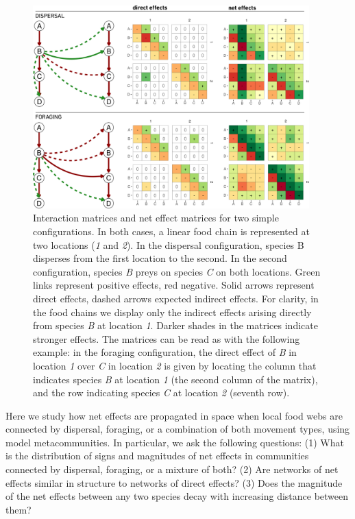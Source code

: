 \begin{figure}[!ht]
\includegraphics[width=0.95\textwidth,height=\textheight,keepaspectratio]{./Figures/chapter05/Fig_1.png}
\caption[Direct and net effects example]{\color{Gray}Interaction matrices and net effect matrices for two simple configurations. In both cases, a linear food chain is represented at two locations (\textit{1} and \textit{2}). In the dispersal configuration, species B disperses from the first location to the second. In the second configuration, species \textit{B} preys on species \textit{C} on both locations. Green links represent positive effects, red negative. Solid arrows represent direct effects, dashed arrows expected indirect effects. For clarity, in the food chains we display only the indirect effects arising directly from species \textit{B} at location \textit{1}. Darker shades in the matrices indicate stronger effects. The matrices can be read as with the following example: in the foraging configuration, the direct effect of \textit{B} in location \textit{1} over \textit{C} in location \textit{2} is given by locating the column that indicates species \textit{B} at location \textit{1} (the second column of the matrix), and the row indicating species \textit{C} at location \textit{2} (seventh row). }\label{fig:fig5.1}
\end{figure}

Here we study how net effects are propagated in space when local food webs are connected by dispersal, foraging, or a combination of both movement types, using model metacommunities. In particular, we ask the following questions: (1) What is the distribution of signs and magnitudes of net effects in communities connected by dispersal, foraging, or a mixture of both? (2) Are networks of net effects similar in structure to networks of direct effects? (3) Does the magnitude of the net effects between any two species decay with increasing distance between them?

